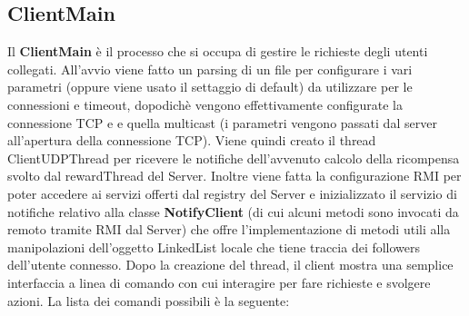 \documentclass[11pt, a4paper, oneside]{article}
\begin{document}
\subsection{ClientMain}
Il \textbf{ClientMain} è il processo che si occupa di gestire le richieste degli utenti collegati. All'avvio viene fatto un parsing di un file per configurare i vari 
parametri (oppure viene usato il settaggio di default) da utilizzare per le connessioni e timeout, dopodichè vengono effettivamente configurate la connessione TCP e e quella 
multicast (i parametri vengono passati dal server all'apertura della connessione TCP). Viene quindi creato il thread ClientUDPThread per ricevere le notifiche dell'avvenuto
calcolo della ricompensa svolto dal rewardThread del Server. Inoltre viene fatta la configurazione RMI per poter accedere ai servizi offerti dal 
registry del Server e inizializzato il servizio di notifiche relativo alla classe \textbf{NotifyClient} (di cui alcuni metodi sono invocati da remoto tramite RMI dal Server) che
offre l'implementazione di metodi utili alla manipolazioni dell'oggetto LinkedList locale che tiene traccia dei followers dell'utente connesso. Dopo la creazione del thread, il client mostra una semplice interfaccia a linea di comando 
con cui interagire per fare richieste e svolgere azioni. La lista dei comandi possibili è la seguente:
\end{document}
